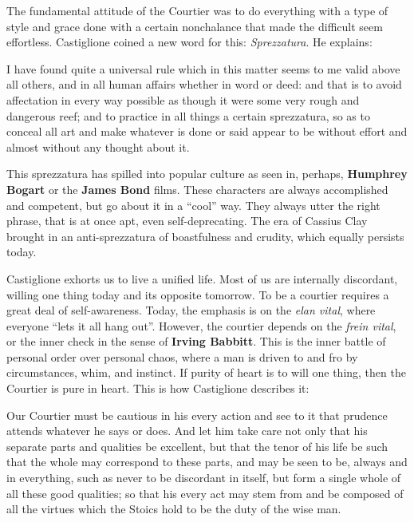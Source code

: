 The fundamental attitude of the Courtier was to do everything with a type of style and grace done with a certain nonchalance that made the difficult seem effortless. Castiglione coined a new word for this: \emph{Sprezzatura}. He explains:


\begin{quotex}
I have found quite a universal rule which in this matter seems to me valid above all others, and in all human affairs whether in word or deed: and that is to avoid affectation in every way possible as though it were some very rough and dangerous reef; and to practice in all things a certain sprezzatura, so as to conceal all art and make whatever is done or said appear to be without effort and almost without any thought about it.
\end{quotex}


This sprezzatura has spilled into popular culture as seen in, perhaps, \textbf{Humphrey Bogart} or the \textbf{James Bond} films. These characters are always accomplished and competent, but go about it in a ``cool'' way. They always utter the right phrase, that is at once apt, even self-deprecating. The era of Cassius Clay brought in an anti-sprezzatura of boastfulness and crudity, which equally persists today.

Castiglione exhorts us to live a unified life. Most of us are internally discordant, willing one thing today and its opposite tomorrow. To be a courtier requires a great deal of self-awareness. Today, the emphasis is on the \emph{elan vital}, where everyone ``lets it all hang out''. However, the courtier depends on the \emph{frein vital}, or the inner check in the sense of \textbf{Irving Babbitt}. This is the inner battle of personal order over personal chaos, where a man is driven to and fro by circumstances, whim, and instinct. If purity of heart is to will one thing, then the Courtier is pure in heart. This is how Castiglione describes it:

\begin{quotex}
Our Courtier must be cautious in his every action and see to it that prudence attends whatever he says or does. And let him take care not only that his separate parts and qualities be excellent, but that the tenor of his life be such that the whole may correspond to these parts, and may be seen to be, always and in everything, such as never to be discordant in itself, but form a single whole of all these good qualities; so that his every act may stem from and be composed of all the virtues which the Stoics hold to be the duty of the wise man.
\end{quotex}


